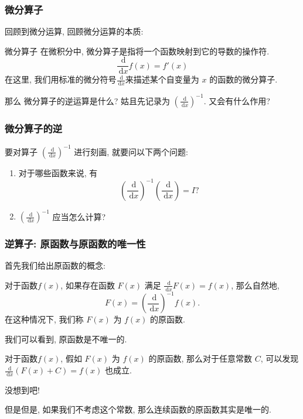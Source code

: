 \documentclass[
10pt,
aspectratio=43,
]{beamer}
\begin{document}
\begin{frame}
	\frametitle{微分算子}
	回顾到微分运算, 回顾微分运算的本质:
	\begin{block}{微分算子}
		在微积分中, 微分算子是指将一个函数映射到它的导数的操作符.
		$$
			\frac{\mathrm{~d}}{\mathrm{~d}x}f(x)=f'(x)
		$$
		在这里, 我们用标准的微分符号$\frac{\mathrm{~d}}{\mathrm{~d}x}$来描述某个自变量为 $x$ 的函数的微分算子.
	\end{block}
	\pause
	\vspace{0.2cm}
	\vfill
	\centering
	{
		\centering
		那么
	}
	\pause
	\vfill
	\centering
	{
		\centering
		微分算子的逆运算是什么? \pause 姑且先记录为 $\displaystyle\left(\frac{\mathrm{~d}}{\mathrm{~d}x}\right)^{-1}$. \pause 又会有什么作用?
	}
\end{frame}

\begin{frame}
	\frametitle{微分算子的逆}
	\begin{block}{}
		要对算子 $\left(\frac{\mathrm{~d}}{\mathrm{~d}x}\right)^{-1}$ 进行刻画, \pause 就要问以下两个问题:
		\vspace{0.3cm}
		\begin{enumerate}
			\pause
			\item 对于哪些函数来说, 有
			      $$
				      \displaystyle\left(\frac{\mathrm{~d}}{\mathrm{~d}x}\right)^{-1}\left(\frac{\mathrm{~d}}{\mathrm{~d}x}\right)=I?
			      $$
			      \vspace{0.2cm}
			      \pause
			\item $\displaystyle\left(\frac{\mathrm{~d}}{\mathrm{~d}x}\right)^{-1}$ 应当怎么计算?
		\end{enumerate}
		\vspace{0.3cm}
	\end{block}
\end{frame}

\begin{frame}
	\frametitle{逆算子: 原函数与原函数的唯一性}
	首先我们给出原函数的概念:
	\begin{block}{}
		对于函数$f(x)$, 如果存在函数 $F(x)$ 满足 $\frac{\mathrm{~d}}{\mathrm{~d}x} F(x) = f(x)$, 那么自然地,
		$$
			F(x)=\displaystyle\left(\frac{\mathrm{~d}}{\mathrm{~d}x}\right)^{-1}f(x).
		$$
		在这种情况下, 我们称 $F(x)$ 为 $f(x)$ 的原函数.
	\end{block}
	\pause
	我们可以看到, 原函数是不唯一的.
	\pause
	\begin{block}{}
		对于函数$f(x)$, 假如 $F(x)$ 为 $f(x)$ 的原函数, 那么对于任意常数 $C$, 可以发现 $\frac{\mathrm{~d}}{\mathrm{~d}x} \left(F(x)+C\right) = f(x)$ 也成立.
	\end{block}
	\pause
	\begin{block}{}
		\vfill
		\centering
		{
			\centering
			没想到吧!
		}
	\end{block}
	但是但是, 如果我们不考虑这个常数, 那么连续函数的原函数其实是唯一的.
\end{frame}
\end{document}

